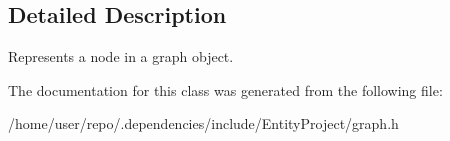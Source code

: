 \subsection{Detailed Description}
Represents a node in a graph object. 

The documentation for this class was generated from the following file\+:\begin{DoxyCompactItemize}
\item 
/home/user/repo/.\+dependencies/include/\+Entity\+Project/graph.\+h\end{DoxyCompactItemize}
